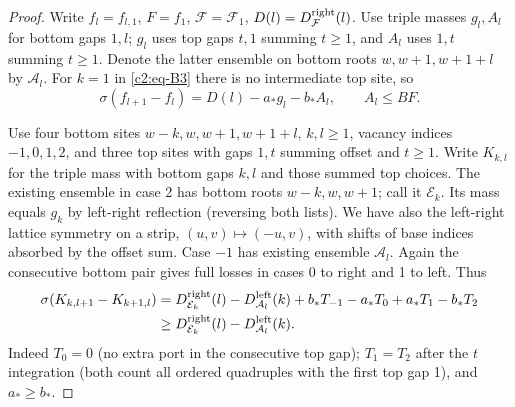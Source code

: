 \begin{proof}
Write \(f_l=f_{l,1}\), \(F=f_1\), \(\mathcal F=\mathcal F_1\), \(D(l)=D^{\rm right}_{\mathcal F}(l)\). Use triple masses \(g_l,A_l\) for bottom gaps \(1,l\); \(g_l\) uses top gaps \(t,1\) summing \(t\ge1\), and \(A_l\) uses \(1,t\) summing \(t\ge1\). Denote the latter ensemble on bottom roots \(w,w+1,w+1+l\) by \(\mathcal A_l\). For \(k=1\) in \eqref{c2:eq-B3} there is no intermediate top site, so
\begin{equation}
 \sigma(f_{l+1}-f_l)=D(l)-a_* g_l-b_* A_l,\qquad A_l\le BF.                 \label{c2:eq-B5}
\end{equation}

Use four bottom sites \(w-k,w,w+1,w+1+l\), \(k,l\ge1\), vacancy indices \(-1,0,1,2\), and three top sites with gaps \(1,t\) summing offset and \(t\ge1\). Write \(K_{k,l}\) for the triple mass with bottom gaps \(k,l\) and those summed top choices. The existing ensemble in case 2 has bottom roots \(w-k,w,w+1\); call it \(\mathcal E_k\). Its mass equals \(g_k\) by left-right reflection (reversing both lists). We have also the left-right lattice symmetry on a strip, \((u,v)\mapsto(-u,v)\), with shifts of base indices absorbed by the offset sum. Case \(-1\) has existing ensemble \(\mathcal A_l\). Again the consecutive bottom pair gives full losses in cases 0 to right and 1 to left. Thus
\begin{equation}
\begin{split}
 \sigma(K_{k,l+1}-K_{k+1,l})
 &=D^{\rm right}_{\mathcal E_k}(l)-D^{\rm left}_{\mathcal A_l}(k)
       +b_*T_{-1}-a_*T_0+a_*T_1-b_*T_2\\
 &\ge D^{\rm right}_{\mathcal E_k}(l)-D^{\rm left}_{\mathcal A_l}(k).
\end{split}                                                               \label{c2:eq-B6}
\end{equation}
Indeed \(T_0=0\) (no extra port in the consecutive top gap); \(T_1=T_2\) after the \(t\) integration (both count all ordered quadruples with the first top gap 1), and \(a_*\ge b_*\).


\end{proof}
